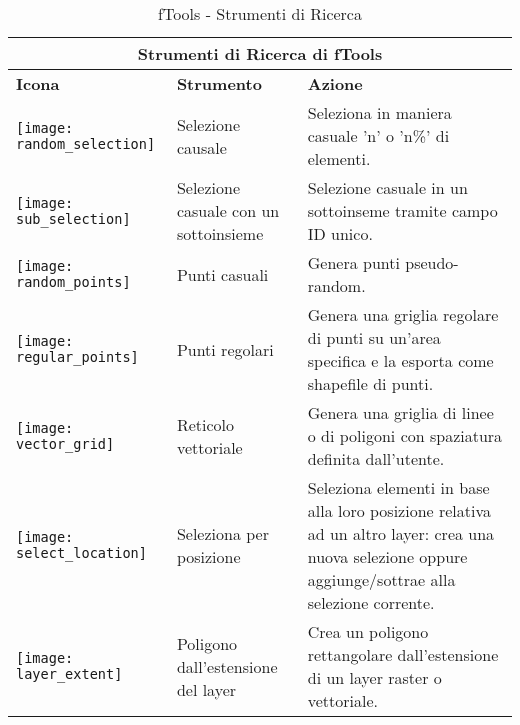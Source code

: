 \begin{table}[ht]
\centering
 \begin{tabular}{|m{1cm}|m{3cm}|m{12cm}|}
 \hline \multicolumn{3}{|c|}{\textbf{Strumenti di Ricerca di fTools}} \\
 \hline \textbf{Icona} & \textbf{Strumento} & \textbf{Azione} \\
 \hline \texttt{[image: random\_selection]} & Selezione causale & Seleziona 
in maniera casuale 'n' o 'n\%' di elementi. \\
 \hline \texttt{[image: sub\_selection]} & Selezione casuale con un sottoinsieme & 
Selezione casuale in un sottoinseme tramite campo ID unico. \\
 \hline \texttt{[image: random\_points]} & Punti casuali & Genera punti 
pseudo-random. \\
 \hline \texttt{[image: regular\_points]} & Punti regolari & Genera 
una griglia regolare di punti su un'area specifica e la esporta come shapefile di punti. \\
 \hline \texttt{[image: vector\_grid]} & Reticolo vettoriale & Genera una griglia 
di linee o di poligoni con spaziatura definita dall'utente. \\
 \hline \texttt{[image: select\_location]} & Seleziona per posizione & 
Seleziona elementi in base alla loro posizione relativa ad un altro layer: crea una nuova selezione 
oppure aggiunge/sottrae alla selezione corrente. \\
\hline \texttt{[image: layer\_extent]} & Poligono dall'estensione del layer & 
Crea un poligono rettangolare dall'estensione di un layer raster o vettoriale. \\
 \hline
\end{tabular}
\caption{fTools - Strumenti di Ricerca}\label{tab:ftool_research}
\end{table}

